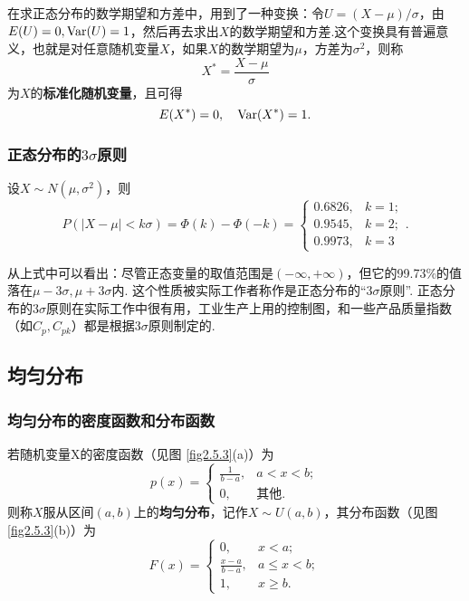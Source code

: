 在求正态分布的数学期望和方差中，用到了一种变换：令$U=(X-\mu)/\sigma$，由$E(U)=0,\operatorname{Var}(U)=1$，然后再去求出$X$的数学期望和方差.这个变换具有普遍意义，也就是对任意随机变量$X$，如果$X$的数学期望为$\mu$，方差为$\sigma^2$，则称
\[
  X^\ast = \frac{X - \mu}\sigma
\]
为$X$的\textbf{标准化随机变量}，且可得
\[
  E(X^\ast) = 0,\quad \operatorname{Var}(X^\ast) = 1.
\]

\subsubsection{正态分布的$3\sigma$原则}
设$X\sim N(\mu,\sigma^2)$，则
\begin{equation}\label{eq2.5.5}
  P(|X - \mu|<k\sigma) = \varPhi(k) - \varPhi(-k) = \begin{cases}
    0.6826, & k = 1; \\
    0.9545, & k = 2; \\
    0.9973, & k = 3
  \end{cases}.
\end{equation}

从上式中可以看出：尽管正态变量的取值范围是$(-\infty,+\infty)$，但它的99.73\%的值落在$\mu-3\sigma,\mu+3\sigma$内. 这个性质被实际工作者称作是正态分布的“$3\sigma$原则”. 正态分布的$3\sigma$原则在实际工作中很有用，工业生产上用的控制图，和一些产品质量指数（如$C_p,C_{pk}$）都是根据$3\sigma$原则制定的.

\subsection{均匀分布}
\subsubsection{均匀分布的密度函数和分布函数}
若随机变量X的密度函数（见图 \ref{fig2.5.3}(a)）为
\begin{equation}\label{eq2.5.6}
  p(x) = \begin{cases}
    \frac1{b-a}, & a < x < b ; \\
    0, & \text{其他}.
  \end{cases}
\end{equation}
则称$X$服从区间$(a,b)$上的\textbf{均匀分布}，记作$X\sim U(a,b)$，其分布函数（见图 \ref{fig2.5.3}(b)）为
\begin{equation}\label{eq2.5.7}
  F(x) = \begin{cases}
    0, & x < a ; \\
    \frac{x-a}{b-a}, & a \le x < b; \\
    1, & x \ge b.
  \end{cases}
\end{equation}

